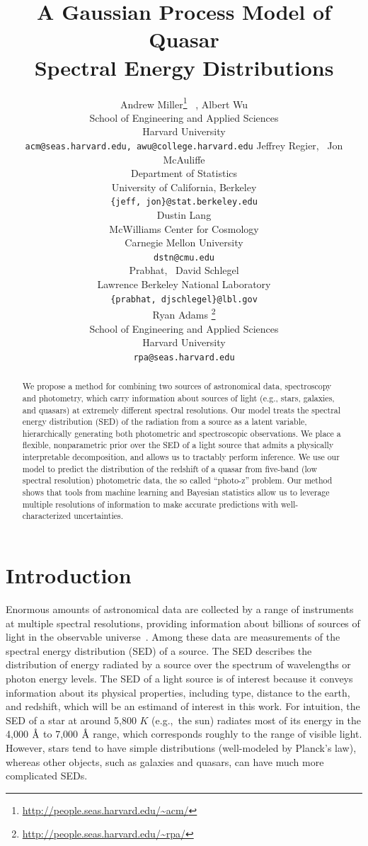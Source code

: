 \documentclass{article} %
\title{A Gaussian Process Model of Quasar \\ Spectral Energy Distributions}
\author{
Andrew Miller\thanks{\url{http://people.seas.harvard.edu/\~acm/}} \, ,  Albert Wu \\
School of Engineering and Applied Sciences\\
Harvard University\\
\texttt{acm@seas.harvard.edu, awu@college.harvard.edu}
\And
Jeffrey Regier, \, Jon McAuliffe \\
Department of Statistics \\
University of California, Berkeley \\
\texttt{\{jeff, jon\}@stat.berkeley.edu} \\
\And
Dustin Lang \\
McWilliams Center for Cosmology \\
Carnegie Mellon University \\
\texttt{dstn@cmu.edu} \\
\And
Prabhat, \, David Schlegel \\
Lawrence Berkeley National Laboratory \\
\texttt{\{prabhat, djschlegel\}@lbl.gov} \\
\And
Ryan Adams \thanks{\url{http://people.seas.harvard.edu/\~rpa/}}\\
School of Engineering and Applied Sciences\\
Harvard University\\
\texttt{rpa@seas.harvard.edu} \\
}
\begin{document}
\maketitle
\begin{abstract} 
We propose a method for combining two sources of astronomical data, spectroscopy and photometry, which carry information about sources of light (e.g., stars, galaxies, and quasars) at extremely different spectral resolutions. 
Our model treats the spectral energy distribution (SED) of the radiation from a source as a latent variable, hierarchically generating both photometric and spectroscopic observations.  
We place a flexible, nonparametric prior over the SED of a light source that admits a physically interpretable decomposition, and allows us to tractably perform inference.  
We use our model to predict the distribution of the redshift of a quasar from five-band (low spectral resolution) photometric data, the so called ``photo-z'' problem. 
Our method shows that tools from machine learning and Bayesian statistics allow us to leverage multiple resolutions of information to make accurate predictions with well-characterized uncertainties. 
\end{abstract} 

\section{Introduction}
Enormous amounts of astronomical data are collected by a range of instruments at multiple spectral resolutions, providing information about billions of sources of light in the observable universe~\cite{alam2015eleventh, martin2005galex}.  
Among these data are measurements of the spectral energy distribution (SED) of a source.  
The SED describes the distribution of energy radiated by a source over the spectrum of wavelengths or photon energy levels.
The SED of a light source is of interest because it conveys information about its physical properties, including type, distance to the earth, and redshift, which will be an estimand of interest in this work. 
For intuition, the SED of a star at around 5,800 $K$ (e.g.,~the sun) radiates most of its energy in the 4,000 $\textup{\AA}$ to 7,000 $\textup{\AA}$ range, which corresponds roughly to the range of visible light.  
However, stars tend to have simple distributions (well-modeled by Planck's law), whereas other objects, such as galaxies and quasars, can have much more complicated SEDs.  
\end{document}
